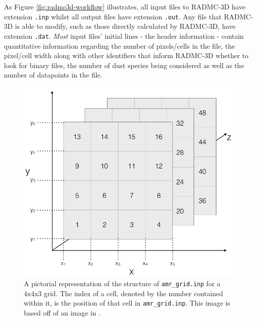 \documentclass{report}
\begin{document}
As Figure \ref{fig:radmc3d-workflow} illustrates, all input files to RADMC-3D have extension \texttt{.inp} whilst all output files have extension \texttt{.out}. Any file that RADMC-3D is able to modify, such as those directly calculated by RADMC-3D, have extension \texttt{.dat}. \textit{Most} input files' initial lines - the header information - contain quantitative information regarding the number of pixels/cells in the file, the pixel/cell width along with other identifiers that inform RADMC-3D whether to look for binary files, the number of dust species being considered as well as the number of datapoints in the file.

\begin{figure}
  \centering
  \includegraphics[scale=0.3]{../img/amr_grid_structure}
  \caption[A pictorial representation of the structure of \texttt{amr\_grid.inp} for a 4x4x3 grid. The index of a cell, denoted by the number contained within it, is the position of that cell in \texttt{amr\_grid.inp}. This image is based off of an image in \textcite{manual}.]{A pictorial representation of the structure of \texttt{amr\_grid.inp} for a 4x4x3 grid. The index of a cell, denoted by the number contained within it, is the position of that cell in \texttt{amr\_grid.inp}. This image is based off of an image in \textcite{manual}.}
  \label{fig:amr_grid_structure}
\end{figure}
\end{document}
